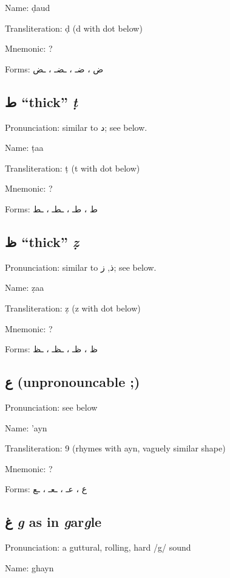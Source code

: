 \documentclass[11pt]{article}
\begin{document}
\noindent Name: ḍaud

\noindent Transliteration: ḍ (d with dot below)

\noindent Mnemonic:  ?

\noindent Forms: \textarabic{ض ، ضـ ، ـضـ ، ـض}

\subsection{ \textarabic{ط} ``thick'' \textit{ṭ}}
Pronunciation: similar to \textarabic{د}; see below.

\noindent Name: ṭaa

\noindent Transliteration: ṭ (t with dot below)

\noindent Mnemonic:  ?

\noindent Forms: \textarabic{ط ، طـ ، ـطـ ، ـط}

\subsection{ \textarabic{ظ} ``thick'' \textit{ẓ}}
Pronunciation: similar to \textarabic{ذ}, \textarabic{ز}; see below.

\noindent Name: ẓaa

\noindent Transliteration: ẓ (z with dot below)

\noindent Mnemonic:  ?

\noindent Forms: \textarabic{ظ ، ظـ ، ـظـ ، ـظ}

\subsection{ \textarabic{ع} (unpronouncable ;)}
Pronunciation: see below

\noindent Name: 'ayn

\noindent Transliteration: 9 (rhymes with ayn, vaguely similar shape)

\noindent Mnemonic:  ?

\noindent Forms: \textarabic{ع ، عـ ، ـعـ ، ـع}

\subsection{ \textarabic{غ} \textit{g} as in \textit{g}ar\textit{g}le}
Pronunciation: a guttural, rolling, hard /g/ sound

\noindent Name: ghayn
\end{document}

